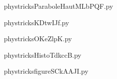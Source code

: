     

    \clearpage
    


    \newcommand{\CaptionFigParaboleHautMLbPQF}{<+Type your caption here+>}
    \begin{center}
        
    \end{center}
    phystricksParaboleHautMLbPQF.py

    

    \clearpage
    


    \newcommand{\CaptionFigKDtwIJf}{<+Type your caption here+>}
    \begin{center}
        
    \end{center}
    phystricksKDtwIJf.py

    

    \clearpage
    


    \newcommand{\CaptionFigOKeZlpK}{<+Type your caption here+>}
    \begin{center}
        
    \end{center}
    phystricksOKeZlpK.py

    

    \clearpage
    


    \newcommand{\CaptionFigHistoTdkccB}{<+Type your caption here+>}
    \begin{center}
        
    \end{center}
    phystricksHistoTdkccB.py

    

    \clearpage
    


    \newcommand{\CaptionFigfigureSCkAAJI}{<+Type your caption here+>}
    \begin{center}
        
    \end{center}
    phystricksfigureSCkAAJI.py

    

    \clearpage
    


